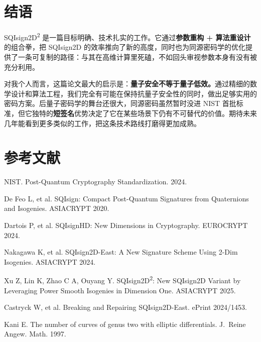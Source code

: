 \documentclass[12pt,a4paper]{ctexart}
\begin{document}
\section{结语}

SQIsign2D\textsuperscript{2} 是一篇目标明确、技术扎实的工作。它通过\textbf{参数重构 + 算法重设计}的组合拳，把 SQIsign2D 的效率推向了新的高度，同时也为同源密码学的优化提供了一条可复制的路径：与其在高维计算里死磕，不如回头审视参数本身有没有被充分利用。

对我个人而言，这篇论文最大的启示是：\textbf{量子安全不等于量子低效。}通过精细的数学设计和算法工程，我们完全有可能在保持抗量子安全性的同时，做出足够实用的密码方案。后量子密码学的舞台还很大，同源密码虽然暂时没进 NIST 首批标准，但它独特的\textbf{短签名}优势决定了它在某些场景下仍有不可替代的价值。期待未来几年能看到更多类似的工作，把这条技术路线打磨得更加成熟。

\section*{参考文献}

\begin{enumerate}[label={[\arabic*]},leftmargin=2.5em,itemsep=0.2em]
    \item NIST. Post-Quantum Cryptography Standardization. 2024.
    \item De Feo L, et al. SQIsign: Compact Post-Quantum Signatures from Quaternions and Isogenies. ASIACRYPT 2020.
    \item Dartois P, et al. SQIsignHD: New Dimensions in Cryptography. EUROCRYPT 2024.
    \item Nakagawa K, et al. SQIsign2D-East: A New Signature Scheme Using 2-Dim Isogenies. ASIACRYPT 2024.
    \item Xu Z, Lin K, Zhao C A, Ouyang Y. SQIsign2D\textsuperscript{2}: New SQIsign2D Variant by Leveraging Power Smooth Isogenies in Dimension One. ASIACRYPT 2025.
    \item Castryck W, et al. Breaking and Repairing SQIsign2D-East. ePrint 2024/1453.
    \item Kani E. The number of curves of genus two with elliptic differentials. J.~Reine Angew. Math. 1997.
\end{enumerate}

\vspace{1em}
\end{document}
